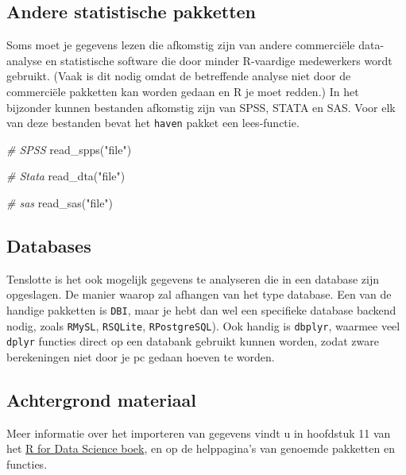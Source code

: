 \documentclass[]{tufte-book}
\newenvironment{Shaded}{}{}
\newcommand{\CommentTok}[1]{\textcolor[rgb]{0.38,0.63,0.69}{\textit{#1}}}
\newcommand{\FunctionTok}[1]{\textcolor[rgb]{0.02,0.16,0.49}{#1}}
\newcommand{\NormalTok}[1]{#1}
\newcommand{\StringTok}[1]{\textcolor[rgb]{0.25,0.44,0.63}{#1}}
\begin{document}
\hypertarget{andere-statistische-pakketten}{%
\subsection{Andere statistische pakketten}\label{andere-statistische-pakketten}}

Soms moet je gegevens lezen die afkomstig zijn van andere commerciële data-analyse en statistische software die door minder R-vaardige medewerkers wordt gebruikt. (Vaak is dit nodig omdat de betreffende analyse niet door de commerciële pakketten kan worden gedaan en R je moet redden.) In het bijzonder kunnen bestanden afkomstig zijn van SPSS, STATA en SAS. Voor elk van deze bestanden bevat het \texttt{haven} pakket een lees-functie.

\begin{Shaded}
\begin{Highlighting}[]
\CommentTok{\# SPSS}
\FunctionTok{read\_spps}\NormalTok{(}\StringTok{"file"}\NormalTok{)}

\CommentTok{\# Stata}
\FunctionTok{read\_dta}\NormalTok{(}\StringTok{"file"}\NormalTok{)}

\CommentTok{\# sas}
\FunctionTok{read\_sas}\NormalTok{(}\StringTok{"file"}\NormalTok{)}
\end{Highlighting}
\end{Shaded}

\hypertarget{databases}{%
\subsection{Databases}\label{databases}}

Tenslotte is het ook mogelijk gegevens te analyseren die in een database zijn opgeslagen. De manier waarop zal afhangen van het type database. Een van de handige pakketten is \texttt{DBI}, maar je hebt dan wel een specifieke database backend nodig, zoals \texttt{RMySL}, \texttt{RSQLite}, \texttt{RPostgreSQL}). Ook handig is \texttt{dbplyr}, waarmee veel \texttt{dplyr} functies direct op een databank gebruikt kunnen worden, zodat zware berekeningen niet door je pc gedaan hoeven te worden.

\hypertarget{achtergrond-materiaal}{%
\subsection{Achtergrond materiaal}\label{achtergrond-materiaal}}

Meer informatie over het importeren van gegevens vindt u in hoofdstuk 11 van het \href{https://r4ds.had.co.nz/data-import.html}{R for Data Science boek}, en op de helppagina's van genoemde pakketten en functies.
\end{document}
